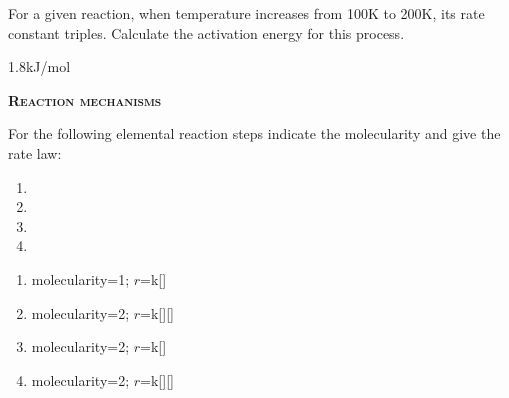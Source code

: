 \documentclass[main.tex]{subfiles}
\begin{document}
\begin{multicols*}{2}
\begin{question}[ID=\the\value{numA}]
For a given reaction, when temperature increases from 100K to 200K, its rate constant triples. 
Calculate the activation energy for this process.
\end{question}
\begin{solution}
1.8kJ/mol
\hspace{0.1cm}\end{solution}%


{\raggedright\textsc{\textbf{Reaction mechanisms }}\par}


\begin{question}[ID=\the\value{numA}]
For the following elemental reaction steps indicate the molecularity and give the rate law:
  \begin{enumerate} [topsep=0pt, partopsep=1pt, label=(\alph*), leftmargin=0.5cm]	
\item {}   %
\item {}%
\item {}%
\item {}%
\end{enumerate}
\end{question}
\begin{solution}
  \begin{enumerate} [topsep=0pt, partopsep=1pt, label=(\alph*), leftmargin=0.5cm]	
\item  molecularity=1; $r$=k[]
\item  molecularity=2; $r$=k[][]
\item  molecularity=2; $r$=k[]
\item  molecularity=2; $r$=k[][]
\end{enumerate}
\hspace{0.1cm}\end{solution}%


\end{multicols*}
\end{document}
